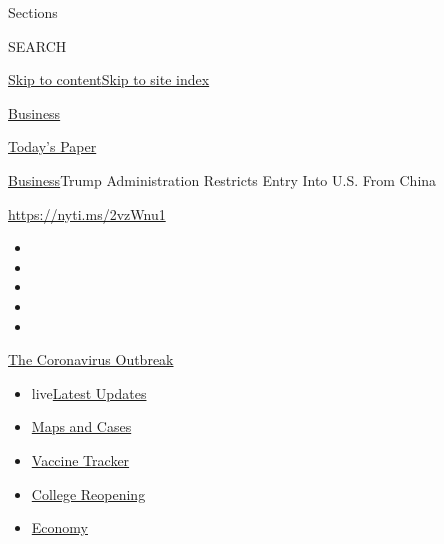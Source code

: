 Sections

SEARCH

\protect\hyperlink{site-content}{Skip to
content}\protect\hyperlink{site-index}{Skip to site index}

\href{https://www.nytimes3xbfgragh.onion/section/business}{Business}

\href{https://myaccount.nytimes3xbfgragh.onion/auth/login?response_type=cookie\&client_id=vi}{}

\href{https://www.nytimes3xbfgragh.onion/section/todayspaper}{Today's
Paper}

\href{/section/business}{Business}\textbar{}Trump Administration
Restricts Entry Into U.S. From China

\url{https://nyti.ms/2vzWnu1}

\begin{itemize}
\item
\item
\item
\item
\item
\end{itemize}

\href{https://www.nytimes3xbfgragh.onion/news-event/coronavirus?action=click\&pgtype=Article\&state=default\&region=TOP_BANNER\&context=storylines_menu}{The
Coronavirus Outbreak}

\begin{itemize}
\tightlist
\item
  live\href{https://www.nytimes3xbfgragh.onion/2020/08/04/world/coronavirus-cases.html?action=click\&pgtype=Article\&state=default\&region=TOP_BANNER\&context=storylines_menu}{Latest
  Updates}
\item
  \href{https://www.nytimes3xbfgragh.onion/interactive/2020/us/coronavirus-us-cases.html?action=click\&pgtype=Article\&state=default\&region=TOP_BANNER\&context=storylines_menu}{Maps
  and Cases}
\item
  \href{https://www.nytimes3xbfgragh.onion/interactive/2020/science/coronavirus-vaccine-tracker.html?action=click\&pgtype=Article\&state=default\&region=TOP_BANNER\&context=storylines_menu}{Vaccine
  Tracker}
\item
  \href{https://www.nytimes3xbfgragh.onion/2020/08/02/us/covid-college-reopening.html?action=click\&pgtype=Article\&state=default\&region=TOP_BANNER\&context=storylines_menu}{College
  Reopening}
\item
  \href{https://www.nytimes3xbfgragh.onion/live/2020/08/04/business/stock-market-today-coronavirus?action=click\&pgtype=Article\&state=default\&region=TOP_BANNER\&context=storylines_menu}{Economy}
\end{itemize}

